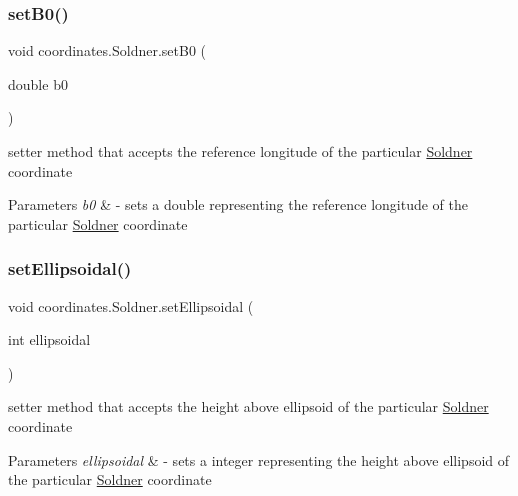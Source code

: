 \subsubsection{\texorpdfstring{set\+B0()}{setB0()}}
{\footnotesize\ttfamily void coordinates.\+Soldner.\+set\+B0 (\begin{DoxyParamCaption}\item[{double}]{b0 }\end{DoxyParamCaption})}



setter method that accepts the reference longitude of the particular \hyperlink{classcoordinates_1_1_soldner}{Soldner} coordinate 


\begin{DoxyParams}{Parameters}
{\em b0} & -\/ sets a double representing the reference longitude of the particular \hyperlink{classcoordinates_1_1_soldner}{Soldner} coordinate \\
\hline
\end{DoxyParams}
\mbox{\label{classcoordinates_1_1_soldner_abf6ceb3d9b6edd741fdd05580b0593fa}} 
\subsubsection{\texorpdfstring{set\+Ellipsoidal()}{setEllipsoidal()}}
{\footnotesize\ttfamily void coordinates.\+Soldner.\+set\+Ellipsoidal (\begin{DoxyParamCaption}\item[{int}]{ellipsoidal }\end{DoxyParamCaption})}



setter method that accepts the height above ellipsoid of the particular \hyperlink{classcoordinates_1_1_soldner}{Soldner} coordinate 


\begin{DoxyParams}{Parameters}
{\em ellipsoidal} & -\/ sets a integer representing the height above ellipsoid of the particular \hyperlink{classcoordinates_1_1_soldner}{Soldner} coordinate \\
\hline
\end{DoxyParams}
\mbox{\label{classcoordinates_1_1_soldner_afc305a8276613f55b9aa79638a514789}} 
